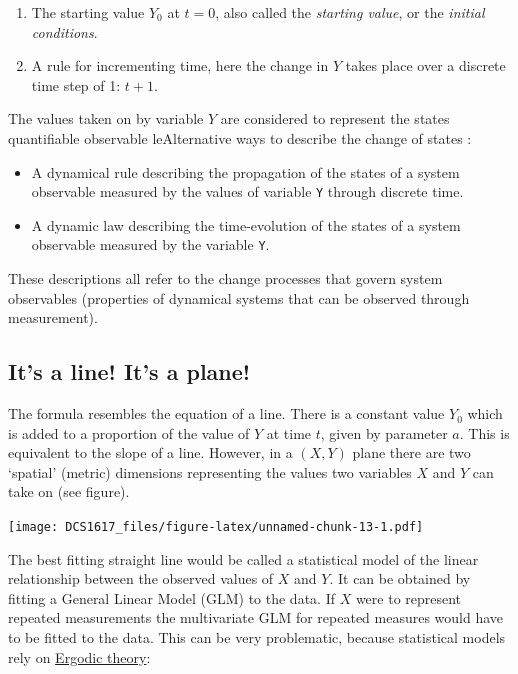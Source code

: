 \documentclass[]{book}
\providecommand{\tightlist}{%
  \setlength{\itemsep}{0pt}\setlength{\parskip}{0pt}}
\begin{document}
\begin{enumerate}
\def\labelenumi{\arabic{enumi}.}
\tightlist
\item
  The starting value \(Y_0\) at \(t=0\), also called the \emph{starting
  value}, or the \emph{initial conditions}.
\item
  A rule for incrementing time, here the change in \(Y\) takes place
  over a discrete time step of 1: \(t+1\).
\end{enumerate}

The values taken on by variable \(Y\) are considered to represent the
states quantifiable observable leAlternative ways to describe the change
of states :

\begin{itemize}
\tightlist
\item
  A dynamical rule describing the propagation of the states of a system
  observable measured by the values of variable \texttt{Y} through
  discrete time.
\item
  A dynamic law describing the time-evolution of the states of a system
  observable measured by the variable \texttt{Y}.
\end{itemize}

These descriptions all refer to the change processes that govern system
observables (properties of dynamical systems that can be observed
through measurement).

\subsection*{\texorpdfstring{\textbf{It's a line! It's a
plane!}}{It's a line! It's a plane!}}\label{its-a-line-its-a-plane}

The formula resembles the equation of a line. There is a constant value
\(Y_{0}\) which is added to a proportion of the value of \(Y\) at time
\(t\), given by parameter \(a\). This is equivalent to the slope of a
line. However, in a \((X,Y)\) plane there are two `spatial' (metric)
dimensions representing the values two variables \(X\) and \(Y\) can
take on (see figure).

\texttt{[image: DCS1617\_files/figure-latex/unnamed-chunk-13-1.pdf]}

The best fitting straight line would be called a statistical model of
the linear relationship between the observed values of \(X\) and \(Y\).
It can be obtained by fitting a General Linear Model (GLM) to the data.
If \(X\) were to represent repeated measurements the multivariate GLM
for repeated measures would have to be fitted to the data. This can be
very problematic, because statistical models rely on
\href{https://en.wikipedia.org/wiki/Ergodic_theory}{Ergodic theory}:
\end{document}
